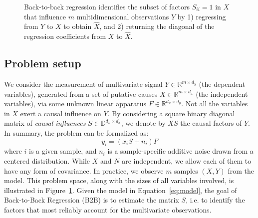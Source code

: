\documentclass[preprint,12pt,3p]{elsarticle}
\begin{document}
\begin{figure}[t!]
  \caption{Back-to-back regression identifies the subset of factors $S_{ii} = 1$ in $X$ that influence $m$ multidimensional observations $Y$ by 1) regressing from $Y$ to $X$ to obtain $\hat{X}$, and 2) returning the diagonal of the regression coefficients from $X$ to $\hat{X}$.}
\label{fig:b2b}
\end{figure}

\subsection{Problem setup}

We consider the measurement of multivariate signal $Y \in \mathbb{R}^{m \times
d_y}$ (the dependent variables), generated from a set of putative causes $X \in \mathbb{R}^{m \times
d_x}$ (the independent variables), via some unknown linear apparatus $F \in \mathbb{R}^{d_x \times d_y}$.
%
Not all the variables in $X$ exert a causal influence on $Y$.
%
By considering a square binary diagonal matrix of \emph{causal influences} $S
\in \mathbb{D}^{d_x \times d_x}$, we denote by $XS$ the causal factors of $Y$.
%
In summary, the problem can be formalized as:
%
\begin{equation}
    y_i = (x_i S + n_i) F
    \label{eq:model}
\end{equation}
%
where $i$ is a given sample, and $n_i$ is a sample-specific additive noise drawn from a
centered distribution.
%
While $X$ and $N$ are independent, we allow each of
them to have any form of covariance.
%
In practice, we observe $m$ samples $(X, Y)$ from the model.
%
This problem space, along with the sizes of all variables involved, is
illustrated in Figure~\ref{fig:b2b}.
%
Given the model in Equation~\cref{eq:model}, the goal of Back-to-Back
Regression (B2B) is to estimate the matrix $S$, i.e. to identify the factors
that most reliably account for the multivariate observations.
\end{document}
